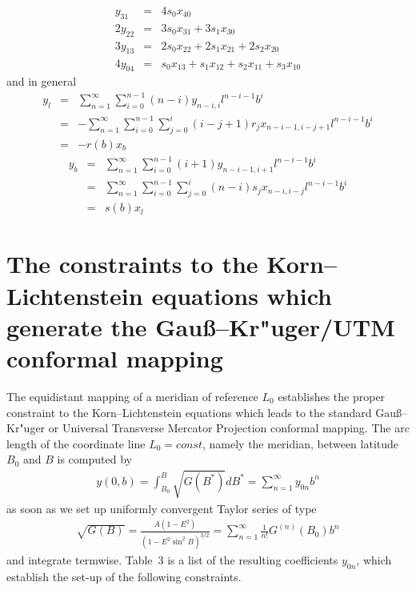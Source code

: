 \documentclass[jog]{svjour}
\begin{document}
\begin{corollary}
\begin{equation}
\begin{array}{rcl}
y_{31} & = & 4s_0x_{40}\\
2y_{22} & = & 3s_0x_{31}+3s_1x_{30}\\
3y_{13} & = & 2s_0x_{22}+2s_1x_{21}+2s_2x_{20}\\
4y_{04} & = & s_0x_{13}+s_1x_{12}+s_2x_{11}+s_3x_{10}
\end{array}
\label{eq:29}
\end{equation}
and in general
\begin{eqnarray*}
y_l &= &\sum_{n=1}^\infty \sum_{i=0}^{n-1} (n-i) y_{n-i,i} l^{n-i-1} b^{i} \\
&= &- \sum_{n=1}^{\infty} \sum_{i=0}^{n-1} \sum_{j=0}^{i} (i-j+1) r_j x_{n-i-1,i-j+1} l^{n-i-1} b^{i} \\
&= &-r(b)x_b
\end{eqnarray*}
\begin{eqnarray*}
y_b &= &\sum_{n=1}^\infty \sum_{i=0}^{n-1} (i+1) y_{n-i-1,i+1} l^{n-i-1} b^{i} \\
&= &\sum_{n=1}^{\infty} \sum_{i=0}^{n-1} \sum_{j=0}^{i} (n-i) s_j x_{n-i,i-j} l^{n-i-1} b^{i} \\
&= &s(b)x_l
\end{eqnarray*}
\end{corollary}



\section{The constraints to the Korn--Lichtenstein equations which
generate the Gau{\ss}--Kr"uger/UTM conformal mapping}
\label{sec:4}

The equidistant mapping of a meridian of reference $L_0$ establishes the proper
constraint to the Korn--Lichtenstein equations which leads to the standard
Gau{\ss}--Kr"uger or Universal Transverse Mercator Projection conformal mapping.
The arc length of the coordinate line $L_0=const$, namely the meridian, between latitude $B_0$
and $B$ is computed by
\setcounter{equation}{29}%
\begin{eqnarray}
y(0,b)=\int_{B_0}^B\sqrt{G(B^*)}dB^*=\sum_{n=1}^\infty y_{0n}b^n
\label{eq:30}
\end{eqnarray}
as soon as we set up uniformly convergent Taylor series of type
\begin{eqnarray}
\sqrt{G(B)}=\frac{A(1-E^2)}{(1-E^2\sin^2B)^{3/2}}=\sum_{n=1}^\infty \frac{1}{n!}G^{(n)}(B_0)b^n
\label{eq:31}
\end{eqnarray}
and integrate termwise. Table~3 is a list of the resulting
coefficients $y_{0n}$, which establish the set-up of the following
constraints.
\end{document}

